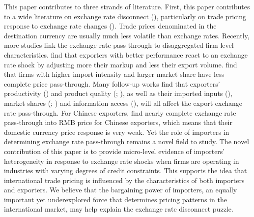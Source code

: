 \documentclass[12pt]{article}
\begin{document}
This paper contributes to three strands of literature. First, this paper contributes to a wide literature on exchange rate disconnect (\cite{obstfeld2000}), particularly on trade pricing response to exchange rate changes (\cite{campa2005}). Trade prices denominated in the destination currency are usually much less volatile than exchange rates. Recently, more studies link the exchange rate pass-through to disaggregated firm-level characteristics. \cite{bmm2012} find that exporters with better performance react to an exchange rate shock by adjusting more their markup and less their export volume. \cite{aik2014} find that firms with higher import intensity and larger market share have less complete price pass-through. Many follow-up works find that exporters' productivity (\cite{lmx2015}) and product quality (\cite{chen2016}; \cite{auer2018}), as well as their imported inputs (\cite{wang-yu2021}), market shares (\cite{auer2016}; \cite{devereux2017}) and information access (\cite{garetto2016}), will all affect the export exchange rate pass-through. For Chinese exporters, \cite{lmx2015} find nearly complete exchange rate pass-through into RMB price for Chinese exporters, which means that their domestic currency price response is very weak. Yet the role of importers in determining exchange rate pass-through remains a novel field to study. The novel contribution of this paper is to provide micro-level evidence of importers' heterogeneity in response to exchange rate shocks when firms are operating in industries with varying degrees of credit constraints. This supports the idea that international trade pricing is influenced by the characteristics of both importers and exporters. We believe that the bargaining power of importers, an equally important yet underexplored force that determines pricing patterns in the international market, may help explain the exchange rate disconnect puzzle. 
\end{document}
